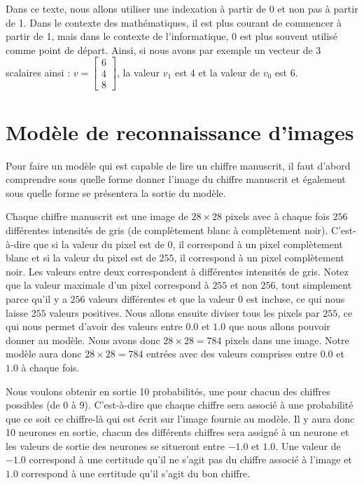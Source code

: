 \documentclass{article}
\begin{document}
Dans ce texte, nous allons utiliser une indexation à partir de 0 et non pas à partir de 1. Dans le contexte des mathématiques, il est plus courant de commencer à partir de 1, mais dans le contexte de l'informatique, 0 est plus souvent utilisé comme point de départ. Ainsi, si nous avons par exemple un vecteur de 3 scalaires ainsi : $v = \begin{bmatrix} 6 \\ 4 \\ 8 \end{bmatrix}$, la valeur $v_1$ est $4$ et la valeur de $v_0$ est $6$.

\section{Modèle de reconnaissance d'images}

Pour faire un modèle qui est capable de lire un chiffre manuscrit, il faut d'abord comprendre sous quelle forme donner l'image du chiffre manuscrit et également sous quelle forme se présentera la sortie du modèle.

\medskip

Chaque chiffre manuscrit est une image de $28 \times 28$ pixels avec à chaque fois $256$ différentes intensités de gris (de complètement blanc à complètement noir). C'est-à-dire que si la valeur du pixel est de $0$, il correspond à un pixel complètement blanc et si la valeur du pixel est de $255$, il correspond à un pixel complètement noir. Les valeurs entre deux correspondent à différentes intensités de gris. Notez que la valeur maximale d'un pixel correspond à $255$ et non $256$, tout simplement parce qu'il y a $256$ valeurs différentes et que la valeur $0$ est incluse, ce qui nous laisse $255$ valeurs positives. Nous allons ensuite diviser tous les pixels par $255$, ce qui nous permet d'avoir des valeurs entre $0.0$ et $1.0$ que nous allons pouvoir donner au modèle. Nous avons donc $28 \times 28 = 784$ pixels dans une image. Notre modèle aura donc $28 \times 28 = 784$ entrées avec des valeurs comprises entre $0.0$ et $1.0$ à chaque fois.

\medskip

Nous voulons obtenir en sortie 10 probabilités, une pour chacun des chiffres possibles (de $0$ à $9$). C'est-à-dire que chaque chiffre sera associé à une probabilité que ce soit ce chiffre-là qui est écrit sur l'image fournie au modèle. Il y aura donc 10 neurones en sortie, chacun des différents chiffres sera assigné à un neurone et les valeurs de sortie des neurones se situeront entre $-1.0$ et $1.0$. Une valeur de $-1.0$ correspond à une certitude qu'il ne s'agit pas du chiffre associé à l'image et $1.0$ correspond à une certitude qu'il s'agit du bon chiffre.
\end{document}
